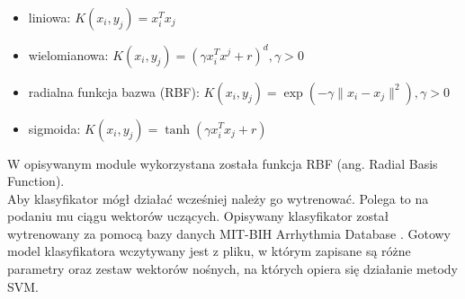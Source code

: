 \begin{itemize}
	\item liniowa: $K\left(x_i,y_j\right)=x_i^Tx_j$
	\item wielomianowa: $K\left(x_i,y_j\right)=\left(\gamma x_i^Tx^j+r\right)^d, \gamma > 0$
	\item radialna funkcja bazwa (RBF): $K\left(x_i,y_j\right)=\exp{\left(-\gamma \|x_i-x_j\|^2\right)}, \gamma > 0$
	\item sigmoida: $K\left(x_i,y_j\right)=\tanh{\left(\gamma x_i^Tx_j+r\right)}$
\end{itemize}

W opisywanym module wykorzystana została funkcja RBF (ang. Radial Basis Function).\\

Aby klasyfikator mógł działać wcześniej należy go wytrenować. Polega to na podaniu mu ciągu wektorów uczących. Opisywany klasyfikator został wytrenowany za pomocą bazy danych MIT-BIH Arrhythmia Database \cite{MITDB}. Gotowy model klasyfikatora wczytywany jest z pliku, w którym zapisane są różne parametry oraz zestaw wektorów nośnych, na których opiera się działanie metody SVM.
